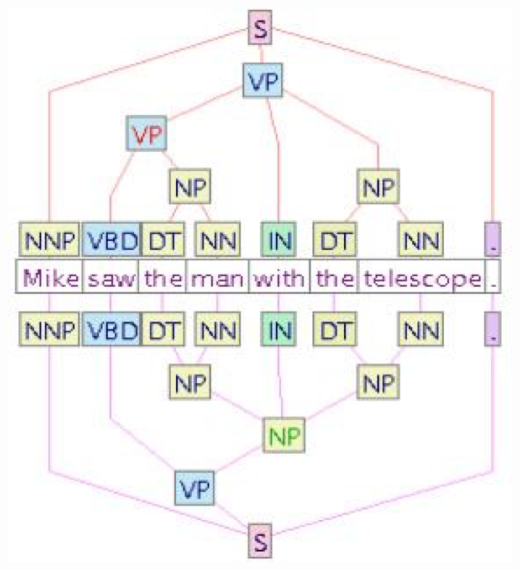 \documentclass{beamer}
\begin{document}
\begin{frame}
\begin{columns}
	\begin{column}{.5\textwidth}
		\vspace{.2cm}			\centerline{\includegraphics[width=\textwidth]{./figs/NLPTM_NLTKgeneral.png}}
	\end{column}

	\end{columns}
	

\end{frame}
\end{document}
